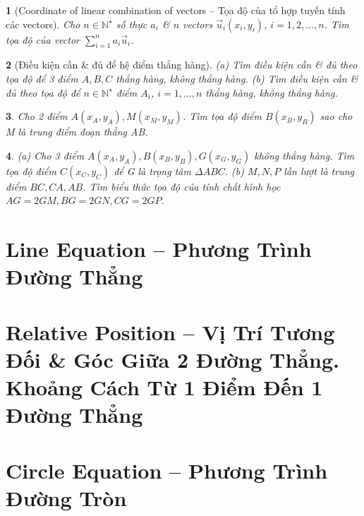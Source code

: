 \documentclass{article}
\newtheorem{baitoan}{}
\begin{document}
\begin{baitoan}[Coordinate of linear combination of vectors -- Tọa độ của tổ hợp tuyến tính các vectors]
	Cho $n\in\mathbb{N}^\star$ số thực $a_i$ \& $n$ vectors $\vec{u}_i(x_i,y_i)$, $i = 1,2,\ldots,n$. Tìm tọa độ của vector $\sum_{i=1}^n a_i\vec{u}_i$.
\end{baitoan}

\begin{baitoan}[Điều kiện cần \& đủ để hệ điểm thẳng hàng]
	(a) Tìm điều kiện cần \& đủ theo tọa độ để 3 điểm $A,B,C$ thẳng hàng, không thẳng hàng. (b) Tìm điều kiện cần \& đủ theo tọa độ để $n\in\mathbb{N}^\star$ điểm $A_i$, $i = 1,\ldots,n$ thẳng hàng, không thẳng hàng.
\end{baitoan}

\begin{baitoan}
	Cho 2 điểm $A(x_A,y_A),M(x_M,y_M)$. Tìm tọa độ điểm $B(x_B,y_B)$ sao cho M là trung điểm đoạn thẳng AB.
\end{baitoan}

\begin{baitoan}
	(a) Cho 3 điểm $A(x_A,y_A),B(x_B,y_B),G(x_G,y_G)$ không thẳng hàng. Tìm tọa độ điểm $C(x_C,y_C)$ để G là trọng tâm $\Delta ABC$. (b) $M,N,P$ lần lượt là trung điểm $BC,CA,AB$. Tìm biểu thức tọa độ của tính chất hình học $AG = 2GM,BG = 2GN,CG = 2GP$.
\end{baitoan}


\section{Line Equation -- Phương Trình Đường Thẳng}


\section{Relative Position -- Vị Trí Tương Đối \& Góc Giữa 2 Đường Thẳng. Khoảng Cách Từ 1 Điểm Đến 1 Đường Thẳng}


\section{Circle Equation -- Phương Trình Đường Tròn}
\end{document}
